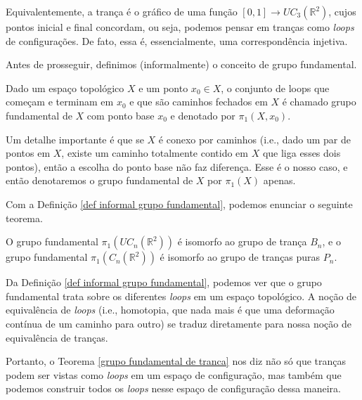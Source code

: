 	\par\vspace{0.3cm} Equivalentemente, a trança é o gráfico de uma função 
	$[0,1]\to UC_3(\mathbb{R}^2)$, cujos pontos inicial e final concordam, ou seja, 
	podemos pensar em tranças como \textit{loops} de configurações. De fato, essa é, 
	essencialmente, uma correspondência injetiva.
	
	\par\vspace{0.3cm} Antes de prosseguir, definimos (informalmente) o conceito de grupo fundamental.
	\begin{definition}
	\label{def informal grupo fundamental}
		Dado um espaço topológico $X$ e um ponto $x_0\in X$, o conjunto de loops que começam e 
		terminam em $x_0$ e que são caminhos fechados em $X$ é chamado grupo fundamental de $X$ 
		com ponto base $x_0$ e denotado por $\pi_1(X,x_0)$.
	\end{definition}
	Um detalhe importante é que se $X$ é conexo por caminhos (i.e., dado um par de pontos em $X$, 
	existe um caminho totalmente contido em $X$ que liga esses dois pontos), então a escolha do 
	ponto base não faz diferença. Esse é o nosso caso, e então denotaremos o grupo fundamental 
	de $X$ por $\pi_1(X)$ apenas.
	
	\par\vspace{0.3cm} Com a Definição \ref{def informal grupo fundamental}, podemos enunciar 
	o seguinte teorema.
	\begin{theorem}
	\label{grupo fundamental de tranca}
		O grupo fundamental $\pi_1(UC_n(\mathbb{R}^2))$ é isomorfo ao grupo de trança $B_n$, 
		e o grupo fundamental $\pi_1(C_n(\mathbb{R}^2))$ é isomorfo ao grupo de tranças puras $P_n$.
	\end{theorem} 
	Da Definição \ref{def informal grupo fundamental}, podemos ver que o grupo fundamental trata 
	sobre os diferentes \textit{loops} em um espaço topológico. A noção de equivalência de 
	\textit{loops} (i.e., homotopia, que nada mais é que uma deformação contínua de um caminho 
	para outro) se traduz diretamente para nossa noção de equivalência de tranças.
	
	\par\vspace{0.3cm} Portanto, o Teorema \ref{grupo fundamental de tranca} nos diz não só 
	que tranças podem ser vistas como \textit{loops} em um espaço de configuração, mas também 
	que podemos construir todos os \textit{loops} nesse espaço de configuração dessa maneira.
	
